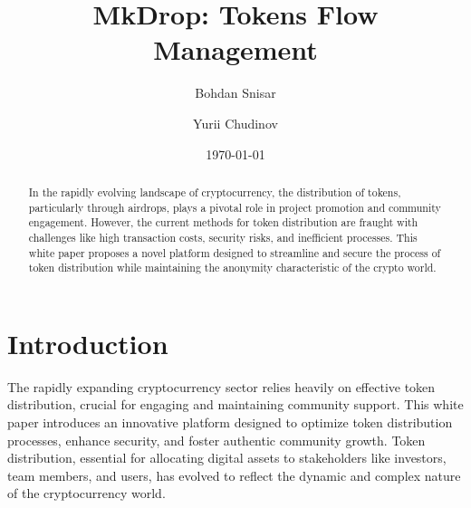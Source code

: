 \documentclass[12pt,oneside]{article}
\date{\small\today}
\title{%
  MkDrop: Tokens Flow Management\\
  \colorbox{mypink}{\small\sffamily\color{white}{White Paper}}}
\author{Bohdan Snisar \and Yurii Chudinov} %
\begin{document}
\raggedbottom

\maketitle
\begin{abstract}
  In the rapidly evolving landscape of cryptocurrency, the distribution of tokens, 
  particularly through airdrops, plays a pivotal role in project promotion 
  and community engagement. However, the current methods for token distribution 
  are fraught with challenges like high transaction costs, security risks, and 
  inefficient processes. This white paper proposes a novel platform designed to 
  streamline and secure the process of token distribution while maintaining the 
  anonymity characteristic of the crypto world.
\end{abstract}


\section{Introduction}

The rapidly expanding cryptocurrency sector relies heavily on effective token distribution,
crucial for engaging and maintaining community support. This white paper introduces an innovative 
platform designed to optimize token distribution processes, enhance security, and foster authentic 
community growth. Token distribution, essential for allocating digital assets to stakeholders like investors, 
team members, and users, has evolved to reflect the dynamic and complex nature of the cryptocurrency world.
\end{document}
